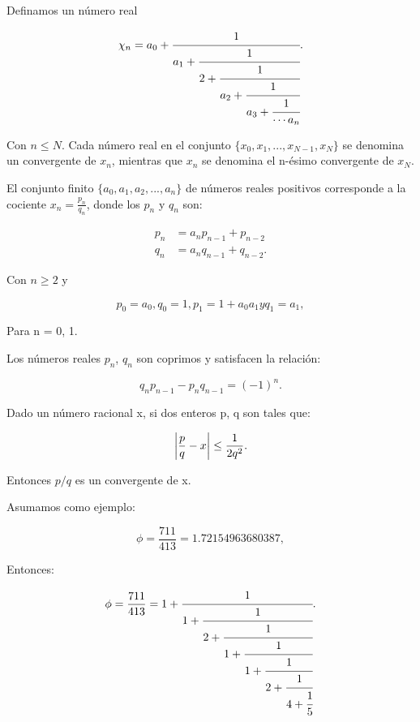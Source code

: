 Definamos un número real

\begin{equation}
    \chi_n=a_0+\cfrac{1}{a_1 + \cfrac{1}{2+\cfrac{1}{a_2 + \cfrac{1}{a_3 + \cfrac{1}{\cdots a_n}}}}} .
\end{equation}

Con $n \leq N$. Cada número real en el conjunto $\{x_0,x_1,...,x_{N-1},x_N\}$ se denomina un convergente de $x_n$, mientras que $x_n$ se denomina el n-ésimo convergente de $x_N$.

El conjunto finito $\{a_0,a_1,a_2,...,a_n\}$ de números reales positivos corresponde a la cociente $x_n = \frac{p_n}{q_n}$, donde los $p_n$ y $q_n$ son:

\begin{align}
    p_n &= a_n p_{n-1} + p_{n-2} \\
    q_n &= a_n q_{n-1} + q_{n-2} .
\end{align}

Con $n \geq 2$ y

\begin{equation}
    p_0 = a_0, q_0 = 1, p_1 = 1 + a_0 a_1 y q_1 = a_1 ,
\end{equation}

Para n = 0, 1.

Los números reales $p_n$, $q_n$ son coprimos y satisfacen la relación:

\begin{equation}
    q_n p_{n-1} - p_n q_{n-1} = (-1)^n .
\end{equation}

Dado un número racional x, si dos enteros p, q son tales que:

\begin{equation}
    \abs{\frac{p}{q} - x} \leq \frac{1}{2q^2} .
\end{equation}

Entonces $p/q$ es un convergente de x.

Asumamos como ejemplo:

\begin{equation}
    \phi = \frac{711}{413} = 1.72154963680387 ,
\end{equation}

Entonces:

\begin{equation}
    \phi = \frac{711}{413} = 1 + \cfrac{1}{1 + \cfrac{1}{2 + \cfrac{1}{1 + \cfrac{1}{1 + \cfrac{1}{2 + \cfrac{1}{4 + \cfrac{1}{5}}}}}}} .
\end{equation}

